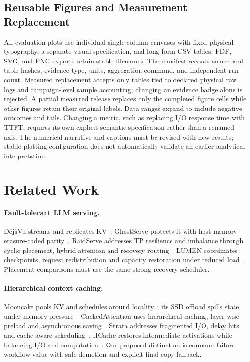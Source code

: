 \documentclass[sigplan,10pt,anonymous,nonacm]{acmart}
\begin{document}
\FloatBarrier
\subsection{Reusable Figures and Measurement Replacement}

All evaluation plots use individual single-column canvases with fixed
physical typography, a separate visual specification, and long-form CSV
tables. PDF, SVG, and PNG exports retain stable filenames. The manifest
records source and table hashes, evidence type, units, aggregation command,
and independent-run count. Measured replacement accepts only tables tied
to declared physical raw logs and campaign-level sample accounting;
changing an evidence badge alone is rejected. A partial measured release
replaces only the completed figure cells while other figures retain their
original labels. Data ranges expand to include negative outcomes and
tails. Changing a metric, such as replacing I/O response time with TTFT,
requires its own explicit semantic specification rather than a renamed
axis. The numerical narrative and captions must be revised with new
results; stable plotting configuration does not automatically validate
an earlier analytical interpretation.

\FloatBarrier

\section{Related Work}
\label{sec:related}

\paragraph{Fault-tolerant LLM serving.}
D\'ej\`aVu streams and replicates KV~\cite{strati2024dejavu}; GhostServe
protects it with host-memory erasure-coded parity~\cite{jayakody2026ghostserve}.
RaidServe addresses TP resilience and imbalance through cyclic placement,
hybrid attention and recovery routing~\cite{xu2026raidserve}. LUMEN
coordinates checkpoints, request redistribution and capacity restoration
under reduced load~\cite{cao2026lumen}. Placement comparisons must use the same strong recovery scheduler.

\paragraph{Hierarchical context caching.}
Mooncake pools KV and schedules around locality~\cite{qin2025mooncake};
its SSD offload spills state under memory pressure~\cite{mooncake2026ssdoffload}.
CachedAttention uses hierarchical caching, layer-wise preload and
asynchronous saving~\cite{gao2024cachedattention}. Strata addresses
fragmented I/O, delay hits and cache-aware scheduling~\cite{xie2026strata}.
HCache restores intermediate activations while balancing I/O and
computation~\cite{gao2025hcache}. Our proposed distinction is common-failure workflow value
with safe demotion and explicit final-copy fallback.
\end{document}
